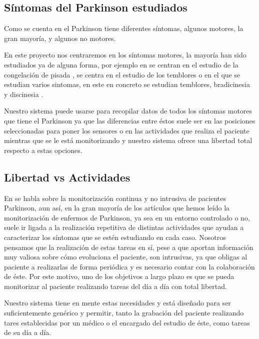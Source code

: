 \documentclass[11pt,spanish]{article}
\begin{document}
\subsection{Síntomas del Parkinson estudiados}
Como se cuenta en \cite{resumen2} el Parkinson tiene diferentes síntomas, algunos motores, la gran mayoría, y algunos no motores. 
\newline

En este proyecto nos centraremos en los síntomas motores, la mayoría han sido estudiados ya de alguna forma, por ejemplo en \cite{resumen3} se centran en el estudio de la congelación de pisada \cite{Gait}, \cite{resumen5} se centra en el estudio de los temblores o \cite{resumen4} en el que se estudian varios sintomas, en este en concreto se estudian temblores, bradicinesia \cite{Hipocinesia} y discinesia \cite{Dyskinesia}.
\newline

Nuestro sistema puede usarse para recopilar datos de todos los síntomas motores que tiene el Parkinson ya que las diferencias entre éstos suele ser en las posiciones seleccionadas para poner los sensores o en las actividades que realiza el paciente mientras que se le está monitorizando y nuestro sistema ofrece una libertad total respecto a estas opciones.

\subsection{Libertad vs Actividades}

En \cite{resumen2} se habla sobre la monitorización continua y no intrusiva de pacientes Parkinson, aun así, en la gran mayoría de los artículos que hemos leído la monitorización de enfermos de Parkinson, ya sea en un entorno controlado o no, suele ir ligada a la realización repetitiva de distintas actividades que ayudan a caracterizar los síntomas que se estén estudiando en cada caso. Nosotros pensamos que la realización de estas tareas en sí, pese a que aportan información muy valiosa sobre cómo evoluciona el paciente, son intrusivas, ya que obligas al paciente a realizarlas de forma periódica y es necesario contar con la colaboración de éste. Por este motivo, uno de los objetivos a largo plazo es que se pueda monitorizar al paciente realizando tareas del día a día con total libertad.
\newline

Nuestro sistema tiene en mente estas necesidades y está diseñado para ser suficientemente genérico y permitir, tanto la grabación del paciente realizando tares establecidas por un médico o el encargado del estudio de éste, como tareas de su día a día.
\end{document}
